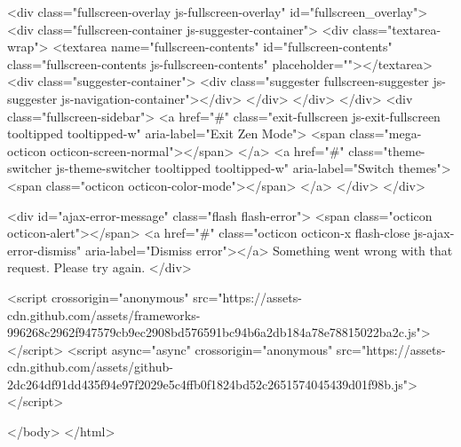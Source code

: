     <div class="fullscreen-overlay js-fullscreen-overlay" id="fullscreen_overlay">
  <div class="fullscreen-container js-suggester-container">
    <div class="textarea-wrap">
      <textarea name="fullscreen-contents" id="fullscreen-contents" class="fullscreen-contents js-fullscreen-contents" placeholder=""></textarea>
      <div class="suggester-container">
        <div class="suggester fullscreen-suggester js-suggester js-navigation-container"></div>
      </div>
    </div>
  </div>
  <div class="fullscreen-sidebar">
    <a href="#" class="exit-fullscreen js-exit-fullscreen tooltipped tooltipped-w" aria-label="Exit Zen Mode">
      <span class="mega-octicon octicon-screen-normal"></span>
    </a>
    <a href="#" class="theme-switcher js-theme-switcher tooltipped tooltipped-w"
      aria-label="Switch themes">
      <span class="octicon octicon-color-mode"></span>
    </a>
  </div>
</div>



    

    <div id="ajax-error-message" class="flash flash-error">
      <span class="octicon octicon-alert"></span>
      <a href="#" class="octicon octicon-x flash-close js-ajax-error-dismiss" aria-label="Dismiss error"></a>
      Something went wrong with that request. Please try again.
    </div>


      <script crossorigin="anonymous" src="https://assets-cdn.github.com/assets/frameworks-996268c2962f947579cb9ec2908bd576591bc94b6a2db184a78e78815022ba2c.js"></script>
      <script async="async" crossorigin="anonymous" src="https://assets-cdn.github.com/assets/github-2dc264df91dd435f94e97f2029e5c4ffb0f1824bd52c2651574045439d01f98b.js"></script>
      
      

  </body>
</html>


